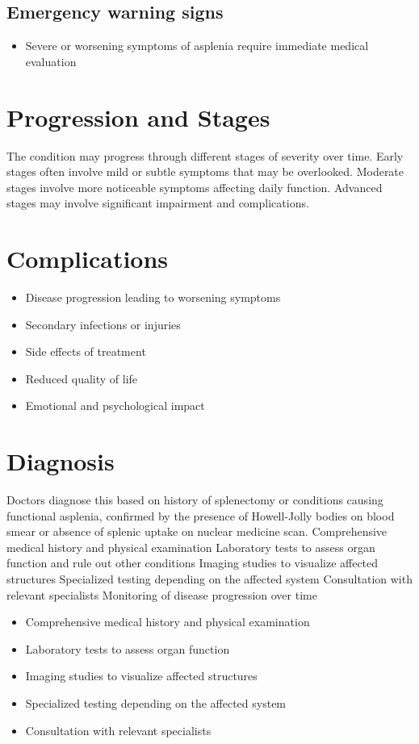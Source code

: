 \subsection{Emergency warning signs}
\begin{itemize}[noitemsep]
  \item Severe or worsening symptoms of asplenia require immediate medical evaluation
\end{itemize}
\section{Progression and Stages}
The condition may progress through different stages of severity over time. Early stages often involve mild or subtle symptoms that may be overlooked. Moderate stages involve more noticeable symptoms affecting daily function. Advanced stages may involve significant impairment and complications.
\section{Complications}
\begin{itemize}[noitemsep]
  \item Disease progression leading to worsening symptoms
  \item Secondary infections or injuries
  \item Side effects of treatment
  \item Reduced quality of life
  \item Emotional and psychological impact
\end{itemize}
\section{Diagnosis}
Doctors diagnose this based on history of splenectomy or conditions causing functional asplenia, confirmed by the presence of Howell-Jolly bodies on blood smear or absence of splenic uptake on nuclear medicine scan. Comprehensive medical history and physical examination Laboratory tests to assess organ function and rule out other conditions Imaging studies to visualize affected structures Specialized testing depending on the affected system Consultation with relevant specialists Monitoring of disease progression over time

\begin{itemize}[noitemsep]
  \item Comprehensive medical history and physical examination
  \item Laboratory tests to assess organ function
  \item Imaging studies to visualize affected structures
  \item Specialized testing depending on the affected system
  \item Consultation with relevant specialists
\end{itemize}
